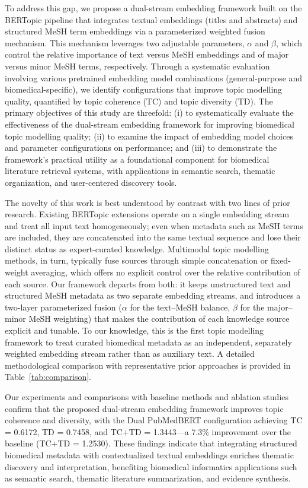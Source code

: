 \documentclass[authorproof,JACIII,researchpaper]{fujipressarticle}
\begin{document}
To address this gap, we propose a dual-stream embedding framework built on the BERTopic pipeline that integrates textual embeddings (titles and abstracts) and structured MeSH term embeddings via a parameterized weighted fusion mechanism. This mechanism leverages two adjustable parameters, $\alpha$ and $\beta$, which control the relative importance of text versus MeSH embeddings and of major versus minor MeSH terms, respectively. Through a systematic evaluation involving various pretrained embedding model combinations (general-purpose and biomedical-specific), we identify configurations that improve topic modelling quality, quantified by topic coherence (TC) and topic diversity (TD). The primary objectives of this study are threefold: (i) to systematically evaluate the effectiveness of the dual-stream embedding framework for improving biomedical topic modelling quality; (ii) to examine the impact of embedding model choices and parameter configurations on performance; and (iii) to demonstrate the framework's practical utility as a foundational component for biomedical literature retrieval systems, with applications in semantic search, thematic organization, and user-centered discovery tools.

The novelty of this work is best understood by contrast with two lines of prior research. Existing BERTopic extensions operate on a single embedding stream and treat all input text homogeneously; even when metadata such as MeSH terms are included, they are concatenated into the same textual sequence and lose their distinct status as expert-curated knowledge. Multimodal topic modelling methods, in turn, typically fuse sources through simple concatenation or fixed-weight averaging, which offers no explicit control over the relative contribution of each source. Our framework departs from both: it keeps unstructured text and structured MeSH metadata as two separate embedding streams, and introduces a two-layer parameterized fusion ($\alpha$ for the text--MeSH balance, $\beta$ for the major--minor MeSH weighting) that makes the contribution of each knowledge source explicit and tunable. To our knowledge, this is the first topic modelling framework to treat curated biomedical metadata as an independent, separately weighted embedding stream rather than as auxiliary text. A detailed methodological comparison with representative prior approaches is provided in Table~\ref{tab:comparison}.

Our experiments and comparisons with baseline methods and ablation studies confirm that the proposed dual-stream embedding framework improves topic coherence and diversity, with the Dual PubMedBERT configuration achieving TC = 0.6172, TD = 0.7458, and TC+TD = 1.3443---a 7.3\% improvement over the baseline (TC+TD = 1.2530). These findings indicate that integrating structured biomedical metadata with contextualized textual embeddings enriches thematic discovery and interpretation, benefiting biomedical informatics applications such as semantic search, thematic literature summarization, and evidence synthesis.
\end{document}
